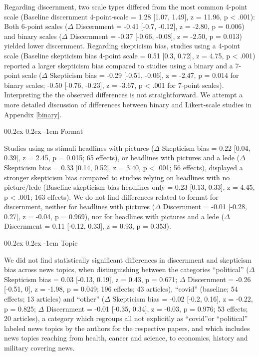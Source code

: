 \documentclass[
  man]{apa6}
\makeatletter
\let\oldparagraph\paragraph
\renewcommand{\paragraph}{
    \@ifstar
      \xxxParagraphStar
      \xxxParagraphNoStar
  }
\newcommand{\xxxParagraphStar}[1]{\oldparagraph*{#1}\mbox{}}
\newcommand{\xxxParagraphNoStar}[1]{\oldparagraph{#1}\mbox{}}
\renewcommand{\paragraph}{\@startsection{paragraph}{4}{\parindent}%
  {0\baselineskip \@plus 0.2ex \@minus 0.2ex}%
  {-1em}%
  {\normalfont\normalsize\bfseries\itshape\typesectitle}}
\makeatother
\begin{document}
Regarding discernment, two scale types differed from the most common 4-point scale (Baseline discernment 4-point-scale = 1.28 {[}1.07, 1.49{]}, z = 11.96, p \textless{} .001): Both 6-point scales (\(\Delta\) Discernment = -0.41 {[}-0.7, -0.12{]}, z = -2.80, p = 0.006) and binary scales (\(\Delta\) Discernment = -0.37 {[}-0.66, -0.08{]}, z = -2.50, p = 0.013) yielded lower discernment. Regarding skepticism bias, studies using a 4-point scale (Baseline skepticism bias 4-point scale = 0.51 {[}0.3, 0.72{]}, z = 4.75, p \textless{} .001) reported a larger skepticism bias compared to studies using a binary and a 7-point scale (\(\Delta\) Skepticism bias = -0.29 {[}-0.51, -0.06{]}, z = -2.47, p = 0.014 for binary scales; -0.50 {[}-0.76, -0.23{]}, z = -3.67, p \textless{} .001 for 7-point scales). Interpreting the the observed differences is not straightforward. We attempt a more detailed discussion of differences between binary and Likert-scale studies in Appendix \ref{binary}.

\paragraph{Format}\label{format}

Studies using as stimuli headlines with pictures (\(\Delta\) Skepticism bias = 0.22 {[}0.04, 0.39{]}, z = 2.45, p = 0.015; 65 effects), or headlines with pictures and a lede (\(\Delta\) Skepticism bias = 0.33 {[}0.14, 0.52{]}, z = 3.40, p \textless{} .001; 56 effects), displayed a stronger skepticism bias compared to studies relying on headlines with no picture/lede (Baseline skepticism bias headlines only = 0.23 {[}0.13, 0.33{]}, z = 4.45, p \textless{} .001; 163 effects). We do not find differences related to format for discernment, neither for headlines with pictures (\(\Delta\) Discernment = -0.01 {[}-0.28, 0.27{]}, z = -0.04, p = 0.969), nor for headlines with pictures and a lede (\(\Delta\) Discernment = 0.11 {[}-0.12, 0.33{]}, z = 0.93, p = 0.353).

\paragraph{Topic}\label{topic}

We did not find statistically significant differences in discernment and skepticism bias across news topics, when distinguishing between the categories ``political'' (\(\Delta\) Skepticism bias = 0.03 {[}-0.13, 0.19{]}, z = 0.43, p = 0.671; \(\Delta\) Discernment = -0.26 {[}-0.51, 0{]}, z = -1.98, p = 0.049; 196 effects; 43 articles), ``covid'' (baseline; 54 effects; 13 articles) and ``other'' (\(\Delta\) Skepticism bias = -0.02 {[}-0.2, 0.16{]}, z = -0.22, p = 0.825; \(\Delta\) Discernment = -0.01 {[}-0.35, 0.34{]}, z = -0.03, p = 0.976; 53 effects; 20 articles), a category which regroups all not explicitly as ``covid''or ``political'' labeled news topics by the authors for the respective papers, and which includes news topics reaching from health, cancer and science, to economics, history and military covering news.
\end{document}
